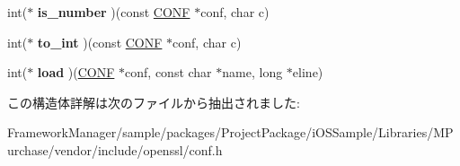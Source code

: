\begin{DoxyCompactItemize}
\item 
\hypertarget{structconf__method__st_a696db4ab9f125a3ccd0c12da8a182cb0}{}int($\ast$ {\bfseries is\+\_\+number} )(const \hyperlink{structconf__st}{C\+O\+N\+F} $\ast$conf, char c)\label{structconf__method__st_a696db4ab9f125a3ccd0c12da8a182cb0}

\item 
\hypertarget{structconf__method__st_afa9903c936cd9de9822cc65f4fe0b34f}{}int($\ast$ {\bfseries to\+\_\+int} )(const \hyperlink{structconf__st}{C\+O\+N\+F} $\ast$conf, char c)\label{structconf__method__st_afa9903c936cd9de9822cc65f4fe0b34f}

\item 
\hypertarget{structconf__method__st_a27a9c46f51b45cebe7401e2e0d2beb3c}{}int($\ast$ {\bfseries load} )(\hyperlink{structconf__st}{C\+O\+N\+F} $\ast$conf, const char $\ast$name, long $\ast$eline)\label{structconf__method__st_a27a9c46f51b45cebe7401e2e0d2beb3c}

\end{DoxyCompactItemize}


この構造体詳解は次のファイルから抽出されました\+:\begin{DoxyCompactItemize}
\item 
Framework\+Manager/sample/packages/\+Project\+Package/i\+O\+S\+Sample/\+Libraries/\+M\+Purchase/vendor/include/openssl/conf.\+h\end{DoxyCompactItemize}
